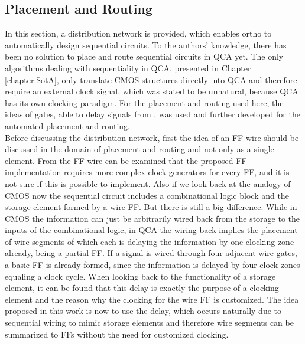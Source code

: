 \subsection{Placement and Routing}
In this section, a distribution network is provided, which enables ortho to automatically design sequential circuits. To the authors' knowledge, there has been no solution to place and route sequential circuits in QCA yet. The only algorithms dealing with sequentiality in QCA, presented in Chapter \ref{chapter:SotA}, only translate CMOS structures directly into QCA and therefore require an external clock signal, which was stated to be unnatural, because QCA has its own clocking paradigm. For the placement and routing used here, the ideas of gates, able to delay signals from \cite{Walter}, was used and further developed for the automated placement and routing.\\
Before discussing the distribution network, first the idea of an FF wire should be discussed in the domain of placement and routing and not only as a single element. From the FF wire can be examined that the proposed FF implementation requires more complex clock generators for every FF, and it is not sure if this is possible to implement. Also if we look back at the analogy of CMOS now the sequential circuit includes a combinational logic block and the storage element formed by a wire FF. But there is still a big difference. While in CMOS the information can just be arbitrarily wired back from the storage to the inputs of the combinational logic, in QCA the wiring back implies the placement of wire segments of which each is delaying the information by one clocking zone already, being a partial FF. If a signal is wired through four adjacent wire gates, a basic FF is already formed, since the information is delayed by four clock zones equaling a clock cycle. When looking back to the functionality of a storage element, it can be found that this delay is exactly the purpose of a clocking element and the reason why the clocking for the wire FF is customized. The idea proposed in this work is now to use the delay, which occurs naturally due to sequential wiring to mimic storage elements and therefore wire segments can be summarized to FFs without the need for customized clocking. 

